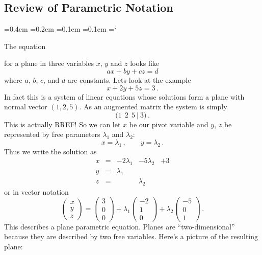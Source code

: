 
\subsection*{Review of Parametric Notation}

{\ttfamily
{}\font=0.4em
\font=0.2em
\font=0.1em
\font=0.1em
\hyphenchar\font=`\-

\hypertarget{scripts_vectors_in_space_n_vectors_parametric}{The equation}  for a plane in three variables $x$, $y$ and $z$ looks like
\[
ax+by+cz=d
\]
where $a$, $b$, $c$, and $d$ are constants.
Lets look at the example
\[
x+2y+5z=3\, .
\]
In fact this is a system of linear equations whose solutions form  a plane with normal vector $(1,2,5)$.
As an augmented matrix the system is simply
\[
\Big( 1 \ \ 2 \ \ 5\ \Big| \ 3 \Big)\, .
\]
This is actually RREF! So we can let $x$ be our pivot variable and $y$, $z$ be represented
by free parameters $\lambda_1$ and $\lambda_2$:
\[
x=\lambda_1\, , \qquad y = \lambda_2\, .
\]
Thus we write the solution as
\[
\begin{array}{ccccc}
x&=&-2\lambda_1&-5\lambda_2&+3\\
y&=&\lambda_1&&\\
z&=&&\lambda_2&
\end{array}
\]
or in vector notation
\[
\begin{pmatrix}
x\\y\\z
\end{pmatrix}
=
\begin{pmatrix}
3\\0\\0
\end{pmatrix}
+\lambda_1
\begin{pmatrix}
-2\\1\\0
\end{pmatrix}
+\lambda_2
\begin{pmatrix}
-5\\0\\1
\end{pmatrix}\, .
\]
This describes a plane parametric equation. Planes are ``two-dimensional'' because they are 
described by two free variables. Here's a picture of the resulting plane:
\begin{center}

\end{center}}
